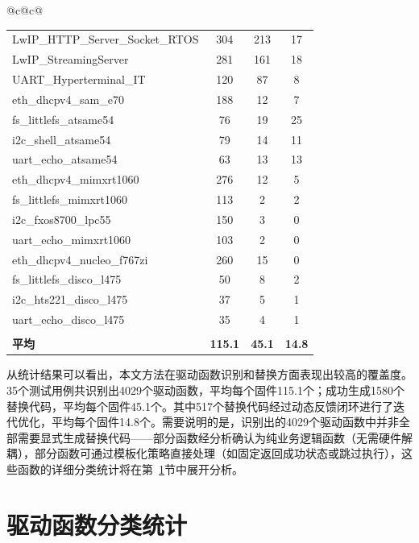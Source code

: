 \begin{table}[H]
{\begin{tabular}{@{}c@{\hspace{0.55em}}c@{}}
\begin{tabular}[t]{lccc}
LwIP\_HTTP\_Server\_Socket\_RTOS & 304 & 213 & 17 \\
LwIP\_StreamingServer & 281 & 161 & 18 \\
UART\_Hyperterminal\_IT & 120 & 87 & 8 \\
eth\_dhcpv4\_sam\_e70 & 188 & 12 & 7 \\
fs\_littlefs\_atsame54 & 76 & 19 & 25 \\
i2c\_shell\_atsame54 & 79 & 14 & 11 \\
uart\_echo\_atsame54 & 63 & 13 & 13 \\
eth\_dhcpv4\_mimxrt1060 & 276 & 12 & 5 \\
fs\_littlefs\_mimxrt1060 & 113 & 2 & 2 \\
i2c\_fxos8700\_lpc55 & 150 & 3 & 0 \\
uart\_echo\_mimxrt1060 & 103 & 2 & 0 \\
eth\_dhcpv4\_nucleo\_f767zi & 260 & 15 & 0 \\
fs\_littlefs\_disco\_l475 & 50 & 8 & 2 \\
i2c\_hts221\_disco\_l475 & 37 & 5 & 1 \\
uart\_echo\_disco\_l475 & 35 & 4 & 1 \\
 & & & \\
\midrule
\textbf{平均} & \textbf{115.1} & \textbf{45.1} & \textbf{14.8} \\
\bottomrule
\end{tabular}
\end{tabular}%
}%
\end{table}

从统计结果可以看出，本文方法在驱动函数识别和替换方面表现出较高的覆盖度。35个测试用例共识别出4029个驱动函数，平均每个固件115.1个；成功生成1580个替换代码，平均每个固件45.1个。其中517个替换代码经过动态反馈闭环进行了迭代优化，平均每个固件14.8个。需要说明的是，识别出的4029个驱动函数中并非全部需要显式生成替换代码——部分函数经分析确认为纯业务逻辑函数（无需硬件解耦），部分函数可通过模板化策略直接处理（如固定返回成功状态或跳过执行），这些函数的详细分类统计将在第~\ref{sec:classify_stats}节中展开分析。


\section{驱动函数分类统计}
\label{sec:classify_stats}

